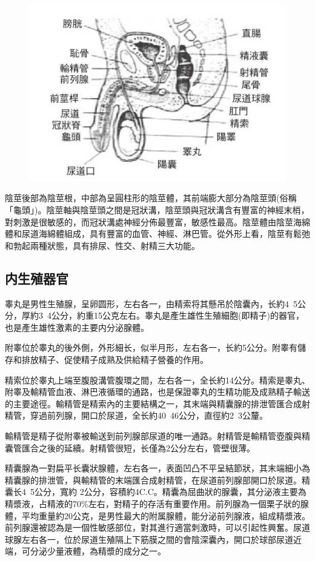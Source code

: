 \documentclass[12pt,UTF8]{ctexbook}
\begin{document}
\begin{figure}
	\centering
	\includegraphics[width=0.7\linewidth]{Images/4}
	\caption{}
\end{figure}

陰莖後部為陰莖根，中部為呈圓柱形的陰莖體，其前端膨大部分為陰莖頭(俗稱「龜頭」)。陰莖軸與陰莖頭之間是冠狀溝，陰莖頭與冠狀溝含有豐富的神經末梢，對刺激是很敏感的，而冠狀溝處神經分佈最豐富，敏感性最高。陰莖體由陰莖海綿體和尿道海綿體組成，具有豐富的血管、神經、淋巴管。從外形上看，陰莖有鬆弛和勃起兩種狀態，具有排尿、性交、射精三大功能。

\subsection{内生殖器官}

睾丸是男性生殖腺，呈卵圆形，左右各一，由精索将其懸吊於陰囊內，长約4~5公分，厚約3~4公分，約重15公克左右。睾丸是產生雄性生殖細胞(即精子)的器官，也是產生雄性激素的主要内分泌腺體。

附睾位於睾丸的後外側，外形細长，似半月形，左右各一，长約5公分。附睾有儲存和排放精子、促使精子成熟及供給精子營養的作用。

精索位於睾丸上端至腹股溝管腹環之間，左右各一，全长約14公分。精索是睾丸、附睾及輸精管血液、淋巴液循環的通路，也是保證睾丸的生精功能及成熟精子輸送的主要途徑。輸精管是精索內的主要結構之一，其末端與精囊腺的排泄管匯合成射精管，穿過前列腺，開口於尿道，全长約40~46公分，直徑約2~3公釐。

輸精管是精子從附睾被輸送到前列腺部尿道的唯一通路。射精管是輸精管壺腹與精囊管匯合之後的延續。射精管很短，长僅為2公分左右，管壁很薄。

精囊腺為一對扁平长囊狀腺體，左右各一，表面凹凸不平呈結節狀，其末端細小為精囊腺的排泄管，與輸精管的末端匯合成射精管，在尿道前列腺部開口於尿道。精囊长4~5公分，寬約 2公分，容積約4C.C。精囊為屈曲狀的腺囊，其分泌液主要為精漿液，占精液的70\%左右，對精子的存活有重要作用。前列腺為一個栗子狀的腺體，平均重量約20公克，是男性最大的附属腺體，能分泌前列腺液，組成精漿液。前列腺還被認為是一個性敏感部位，對其進行適當刺激時，可以引起性興奮。尿道球腺左右各一，位於尿道生殖隔上下筋膜之間的會陰深囊內，開口於球部尿道近端，可分泌少量液體，為精漿的成分之一。
\end{document}
